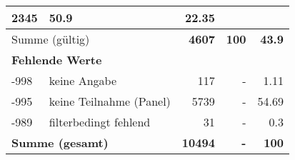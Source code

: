 \begin{longtable}{lXrrr}
       \num{2345} &
       \num[round-mode=places,round-precision=2]{50.9} &
         \num[round-mode=places,round-precision=2]{22.35} \\
     \midrule
     \multicolumn{2}{l}{Summe (gültig)} &
       \textbf{\num{4607}} &
     \textbf{\num{100}} &
       \textbf{\num[round-mode=places,round-precision=2]{43.9}} \\
     \multicolumn{5}{l}{\textbf{Fehlende Werte}}\\
       -998 &
       keine Angabe &
         \num{117} &
        - &
         \num[round-mode=places,round-precision=2]{1.11} \\
       -995 &
       keine Teilnahme (Panel) &
         \num{5739} &
        - &
         \num[round-mode=places,round-precision=2]{54.69} \\
       -989 &
       filterbedingt fehlend &
         \num{31} &
        - &
         \num[round-mode=places,round-precision=2]{0.3} \\
     \midrule
     \multicolumn{2}{l}{\textbf{Summe (gesamt)}} &
          \textbf{\num{10494}} &
        \textbf{-} &
        \textbf{\num{100}} \\
     \bottomrule
     \end{longtable}
     

